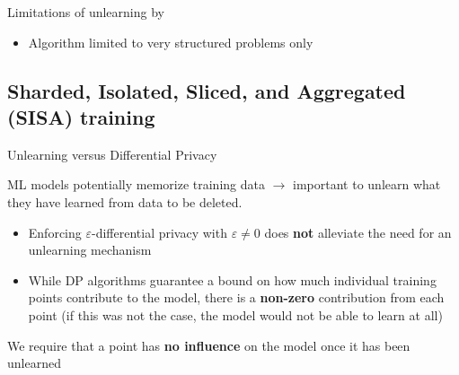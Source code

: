 \documentclass[12pt,aspectratio=169,handout]{beamer}
\begin{document}
\begin{frame}{Limitations of unlearning by \citet{Cao.Yang.2015.SP}}

\begin{itemize}
\item Algorithm limited to very structured problems only \citep{Sekhari.et.al.2021.NeurIPS}
\end{itemize}



\end{frame}



\subsection{Sharded, Isolated, Sliced, and Aggregated (SISA) training}

\begin{frame}{Unlearning versus Differential Privacy}

ML models potentially memorize training data $\to$ important to unlearn what they have learned from data to be deleted.

\begin{itemize}
\item Enforcing $\varepsilon$-differential privacy with $\varepsilon \neq 0$ does \textbf{not} alleviate the need for an unlearning mechanism
\item While DP algorithms guarantee a bound on how much individual training points contribute to the model, there is a \textbf{non-zero} contribution from each point (if this was not the case, the model would not be able to learn at all)
\end{itemize}

We require that a point has \textbf{no influence} on the model once it has been unlearned



\end{frame}
\end{document}
